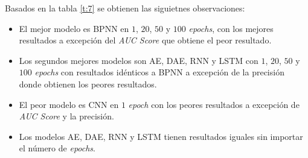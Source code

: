 Basados en la tabla \ref{t:7} se obtienen las siguietnes observaciones:
\begin{itemize}
	\item El mejor modelo es BPNN en $1$, $20$, $50$ y $100$ \textit{epochs}, con los mejores resultados a excepci\'{o}n del \textit{AUC Score} que obtiene el peor resultado.
	\item Los segundos mejores modelos son AE, DAE, RNN y LSTM con $1$, $20$, $50$ y $100$ \textit{epochs} con resultados id\'{e}nticos a BPNN a excepci\'{o}n de la precisi\'{o}n donde obtienen los peores resultados.
	\item El peor modelo es CNN en $1$ \textit{epoch} con los peores resultados a excepci\'{o}n de \textit{AUC Score} y la precisi\'{o}n.
	\item Los modelos AE, DAE, RNN y LSTM tienen resultados iguales sin importar el n\'{u}mero de \textit{epochs}.
\end{itemize}

